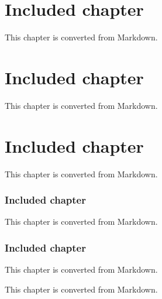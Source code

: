 \section{Included chapter}

This chapter is converted from Markdown.

\section{Included chapter}

This chapter is converted from Markdown.

\section{Included chapter}

This chapter is converted from Markdown.

\begin{frame}[t]
\frametitle{Included chapter}

\end{frame}

\begin{frame}[t]

This chapter is converted from Markdown.

\end{frame}

\begin{frame}[t]
\frametitle{Included chapter}

This chapter is converted from Markdown.

\end{frame}

\begin{frame}[t]

This chapter is converted from Markdown.

\end{frame}

